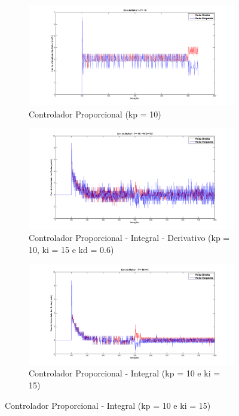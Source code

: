 \begin{figure}[!htb]
	\centering
	\begin{subfigure}{.5\textwidth}
		\centering
		\includegraphics[width=.9\linewidth]{./Testes/Malha1/PID/m1_kp10}
		\caption{Controlador Proporcional (kp = 10)}
		\label{fig:contP}
	\end{subfigure}%
	\begin{subfigure}{.5\textwidth}
		\centering
		\includegraphics[width=.9\linewidth]{./Testes/Malha1/PID/m1_kp10ki15kd06}
		\caption{Controlador Proporcional - Integral - Derivativo (kp = 10, ki = 15 e kd = 0.6)}
		\label{fig:contPID2}
	\end{subfigure}
	\begin{subfigure}{0.5\textwidth}
	\centering
	\includegraphics[width=.9\linewidth]{./Testes/Malha1/PID/m1_kp10ki15}
	\caption{Controlador Proporcional - Integral (kp = 10 e ki = 15)}

\end{subfigure}
\end{figure}
